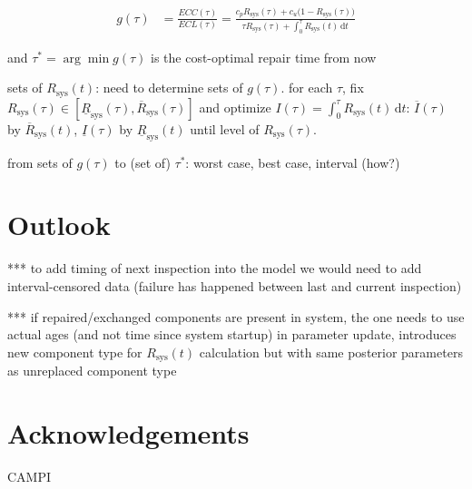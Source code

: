 \documentclass[authoryear]{elsarticle}
\newcommand{\dd}{\,\mathrm{d}}
\newcommand{\ul}[1]{\underline{#1}}
\newcommand{\ol}[1]{\overline{#1}}
\newcommand{\Rsys}{R_\text{sys}}
\newcommand{\lRsys}{\ul{R}_\text{sys}}
\newcommand{\uRsys}{\ol{R}_\text{sys}}
\def\Rsys{R_\text{sys}}
\begin{document}
\begin{align*}
g(\tau) &= \frac{ECC(\tau)}{ECL(\tau)} = \frac{c_p \Rsys(\tau) + c_u \big(1-\Rsys(\tau)\big)}{\tau \Rsys(\tau) + \int_0^\tau \Rsys(t) \dd t}
\end{align*}

and $\tau^* = \arg\min g(\tau)$ is the cost-optimal repair time from now

sets of $\Rsys(t)$: need to determine sets of $g(\tau)$.
for each $\tau$, fix $\Rsys(\tau) \in [\lRsys(\tau), \uRsys(\tau)]$ and optimize $I(\tau) = \int_0^\tau \Rsys(t) \dd t$:
$\ol{I}(\tau)$ by $\uRsys(t)$, $\ul{I}(\tau)$ by $\lRsys(t)$ until level of $\Rsys(\tau)$.

from sets of $g(\tau)$ to (set of) $\tau^*$:
worst case, best case, interval (how?)


\section{Outlook}

*** to add timing of next inspection into the model we would need to add interval-censored data
(failure has happened between last and current inspection)

*** if repaired/exchanged components are present in system,
the one needs to use actual ages (and not time since system startup) in parameter update,
introduces new component type for $\Rsys(t)$ calculation but with same posterior parameters as unreplaced component type


\section*{Acknowledgements}

CAMPI



\end{document}
